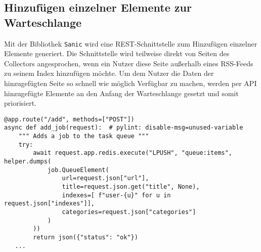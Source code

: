\subsection{Hinzufügen einzelner Elemente zur Warteschlange}
Mit der Bibliothek \texttt{Sanic} wird eine REST-Schnittstelle zum Hinzufügen einzelner Elemente generiert.
Die Schnittstelle wird teilweise direkt von Seiten des Collectors angesprochen, wenn ein Nutzer diese Seite außerhalb eines RSS-Feeds zu seinem Index hinzufügen möchte.
Um dem Nutzer die Daten der hinzugefügten Seite so schnell wie möglich Verfügbar zu machen, werden per API hinzugefügte Elemente an den Anfang der Warteschlange gesetzt und somit priorisiert.
\begin{verbatim}
@app.route("/add", methods=["POST"])
async def add_job(request):  # pylint: disable-msg=unused-variable
    """ Adds a job to the task queue """
    try:
        await request.app.redis.execute("LPUSH", "queue:items", helper.dumps(
            job.QueueElement(
                url=request.json["url"],
                title=request.json.get("title", None),
                indexes=[ f"user-{u}" for u in request.json["indexes"]],
                categories=request.json["categories"]
            )
        ))
        return json({"status": "ok"})
   ...
\end{verbatim}
